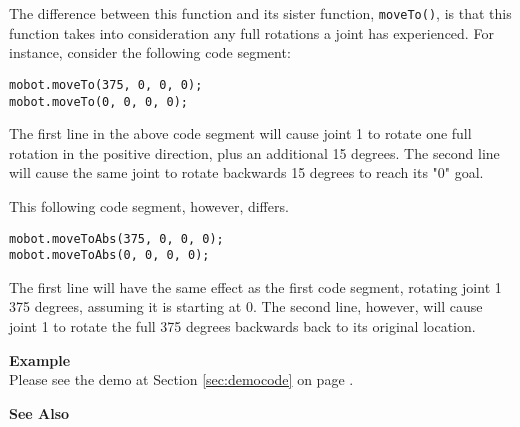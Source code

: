 The difference between this function and its sister function, \texttt{moveTo()},
is that this function takes into consideration any full rotations a joint has 
experienced. For instance, consider the following code segment:
\begin{verbatim}
mobot.moveTo(375, 0, 0, 0);
mobot.moveTo(0, 0, 0, 0);
\end{verbatim}
The first line in the above code segment will cause joint 1 to rotate one full
rotation in the positive direction, plus an additional 15 degrees. The second
line will cause the same joint to rotate backwards 15 degrees to reach its "0"
goal.

This following code segment, however, differs.
\begin{verbatim}
mobot.moveToAbs(375, 0, 0, 0);
mobot.moveToAbs(0, 0, 0, 0);
\end{verbatim}
The first line will have the same effect as the first code segment, rotating
joint 1 375 degrees, assuming it is starting at 0. The second line, however,
will cause joint 1 to rotate the full 375 degrees backwards back to its original 
location.

\noindent
{\bf Example}\\
Please see the demo at Section \ref{sec:democode} on page \pageref{sec:democode}.\\
\noindent

\noindent
{\bf See Also}\\

